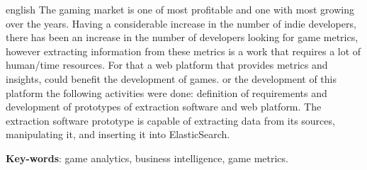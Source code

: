 \begin{resumo}[Abstract]
 \begin{otherlanguage*}{english}
 	The gaming market is one of most profitable and one with most growing over the years. Having a considerable increase in the number of indie developers, there has been an increase in the number of developers looking for game metrics, however extracting information from these metrics is a work that requires a lot of human/time resources. For that a web platform that provides metrics and insights, could benefit the development of games. or the development of this platform the following activities were done: definition of requirements and development of prototypes of extraction software and web platform. The extraction software prototype is capable of extracting data from its sources, manipulating it, and inserting it into ElasticSearch.

   \vspace{\onelineskip}
 
   \noindent 
   \textbf{Key-words}: game analytics, business intelligence, game metrics.
 \end{otherlanguage*}
\end{resumo}
